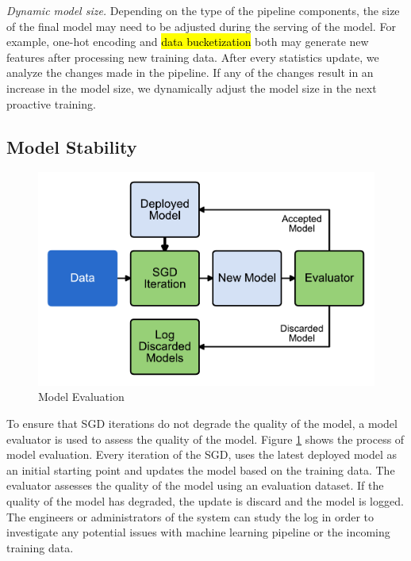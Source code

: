 \textit{Dynamic model size.}
Depending on the type of the pipeline components, the size of the final model may need to be adjusted during the serving of the model.
For example, one-hot encoding and \hl{data bucketization} both may generate new features after processing new training data.
After every statistics update, we analyze the changes made in the pipeline.
If any of the changes result in an increase in the model size, we dynamically adjust the model size in the next proactive training. 

\subsection{Model Stability}
\begin{figure}[t]
\centering
\includegraphics[width=\columnwidth]{../images/model-evaluation.pdf}
\caption{Model Evaluation}
\label{fig:model-evaluation}
\end{figure}

To ensure that SGD iterations do not degrade the quality of the model, a model evaluator is used to assess the quality of the model.
Figure \ref{fig:model-evaluation} shows the process of model evaluation.
Every iteration of the SGD, uses the latest deployed model as an initial starting point and updates the model based on the training data.
The evaluator assesses the quality of the model using an evaluation dataset.
If the quality of the model has degraded, the update is discard and the model is logged.
The engineers or administrators of the system can study the log in order to investigate any potential issues with machine learning pipeline or the incoming training data.

